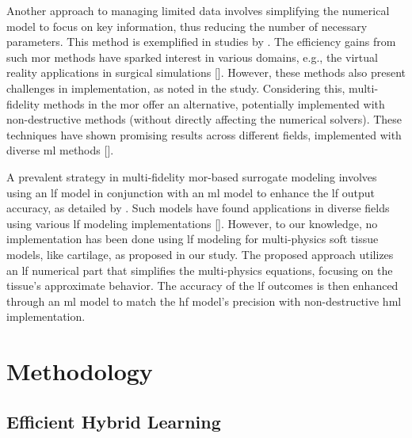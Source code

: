 Another approach to managing limited data involves simplifying the numerical model to focus on key information, thus reducing the number of necessary parameters. This method is exemplified in studies by \cite{pellicer-valero2020,niroomandi2012}. The efficiency gains from such \ac{mor} methods have sparked interest in various domains, e.g., the virtual reality applications in surgical simulations [\cite{cueto2014}]. However, these methods also present challenges in implementation, as noted in the \cite{lauzeral2019} study. Considering this, multi-fidelity methods in the \ac{mor} offer an alternative, potentially implemented with non-destructive methods (without directly affecting the numerical solvers). These techniques have shown promising results across different fields, implemented with diverse \ac{ml} methods [\cite{ahn2022,zhang2022,cheng2021,yang2019}].

A prevalent strategy in multi-fidelity \ac{mor}-based surrogate modeling involves using an \ac{lf} model in conjunction with an \ac{ml} model to enhance the \ac{lf} output accuracy, as detailed by \cite{peherstorfer2018}. Such models have found applications in diverse fields using various \ac{lf} modeling implementations [\cite{zhang2021,zhou2017}]. However, to our knowledge, no implementation has been done using \ac{lf} modeling for multi-physics soft tissue models, like cartilage, as proposed in our study. The proposed approach utilizes an \ac{lf} numerical part that simplifies the multi-physics equations, focusing on the tissue's approximate behavior. The accuracy of the \ac{lf} outcomes is then enhanced through an \ac{ml} model to match the \ac{hf} model's precision with non-destructive \ac{hml} implementation.

\section{Methodology}

\subsection{Efficient Hybrid Learning}

